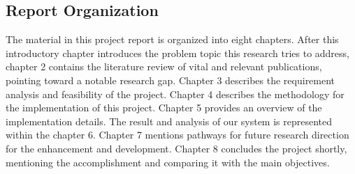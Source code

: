 
\subsection{Report Organization}
The material in this project report is organized into eight chapters. After this introductory chapter introduces the problem topic this research tries to address, chapter 2 contains the literature review of vital and relevant publications, pointing toward a notable research gap. Chapter 3 describes the requirement analysis and feasibility of the project. Chapter 4 describes the methodology for the implementation of this project. Chapter 5 provides an overview of the implementation details. The result and analysis of our system is represented within the chapter 6. Chapter 7 mentions pathways for future research direction for the enhancement and development. Chapter 8 concludes the project shortly, mentioning the accomplishment and comparing it with the main objectives.